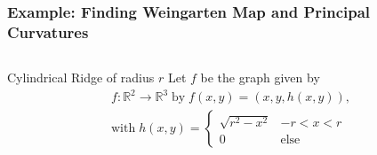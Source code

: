 \documentclass[9pt,notes]{beamer}
\newcommand{\R}{\mathbb{R}} %
\begin{document}
\begin{frame}
\frametitle{Example: Finding Weingarten Map and Principal Curvatures}
\begin{columns}
  \begin{column}{0.5\textwidth}
    \begin{block}{Cylindrical Ridge of radius $r$}
      Let $f$ be the graph given by 
      \begin{gather*}
      f: \R^2 \to \R^3 \;\textrm{by}\; f(x,y) = (x,y,h(x,y)), \\
      \textrm{with}\;
      h(x,y) = \begin{cases}
      \sqrt{r^2 - x^2} & -r < x < r \\
      0 & \textrm{else}
      \end{cases}
      \end{gather*}
    \end{block}
  \end{column}
  

\end{columns}
\end{frame}
\end{document}
